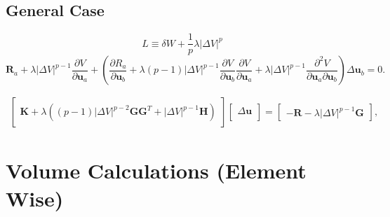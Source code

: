 \subsection{General Case}
%
\begin{equation}
L \equiv \delta W + \frac{1}{p}\lambda |\Delta V|^p
\label{eq:general_Lagrangian}
\end{equation}
%
%
\begin{equation}
\pmb{R}_a + \lambda  |\Delta V|^{p-1} \frac{\partial V}{\partial \pmb{u}_a}
%
+ \left(\frac{\partial R_a}{\partial \pmb{u}_b} + \lambda(p-1)|\Delta V|^{p-1} \frac{\partial V}{\partial \pmb{u}_b} \frac{\partial V}{\partial \pmb{u}_a} + \lambda |\Delta V|^{p-1} \frac{\partial^2 V}{\partial \pmb{u}_a \partial \pmb{u}_b} \right) \Delta \pmb{u}_b  =0.
\label{eq:general_taylor-expand_feedback}
\end{equation}
%

%
\begin{eqnarray}
\begin{bmatrix}
\textbf{K} + \lambda \left((p-1)|\Delta V|^{p-2}\textbf{G} \textbf{G}^T + |\Delta V|^{p-1} \textbf{H} \right) 
\end{bmatrix}
%
\begin{bmatrix}
\Delta \textbf{u} \\
\end{bmatrix}
%
= \begin{bmatrix}
-\textbf{R}-\lambda|\Delta V|^{p-1} \textbf{G}
\end{bmatrix},
\label{eq:general_taylor-expand_matrix_feedback}
\end{eqnarray}
%

\section{Volume Calculations (Element Wise)}

